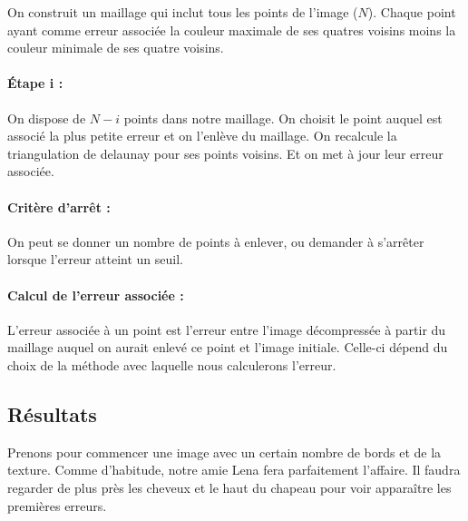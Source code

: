 \documentclass{report}
\begin{document}
On construit un maillage qui inclut tous les points de l'image ($N$). Chaque point ayant comme erreur associée la couleur maximale de ses quatres voisins moins la couleur minimale de ses quatre voisins.

\paragraph{Étape i :}

On dispose de $N-i$ points dans notre maillage.
On choisit le point auquel est associé la plus petite erreur et on l'enlève du maillage.
On recalcule la triangulation de delaunay pour ses points voisins.
Et on met à jour leur erreur associée.

\paragraph{Critère d'arrêt :}
On peut se donner un nombre de points à enlever, ou demander à s'arrêter lorsque l'erreur atteint un seuil.

\paragraph{Calcul de l'erreur associée :}
L'erreur associée à un point est l'erreur entre l'image décompressée à partir du maillage auquel on aurait enlevé ce point et l'image initiale. Celle-ci dépend du choix de la méthode avec laquelle nous calculerons l'erreur.

\subsection{Résultats}

Prenons pour commencer une image avec un certain nombre de bords et de la texture. Comme d'habitude, notre amie Lena fera parfaitement l'affaire. Il faudra regarder de plus près les cheveux et le haut du chapeau pour voir apparaître les premières erreurs.

\clearpage
\end{document}
